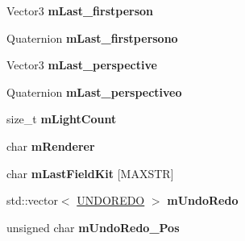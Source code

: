 \begin{DoxyCompactItemize}
\item 
\hypertarget{class_p_f_d_application_afeb39c3ebfbe8d4770601bf56597bfa7}{
Vector3 {\bfseries mLast\_\-firstperson}}
\label{class_p_f_d_application_afeb39c3ebfbe8d4770601bf56597bfa7}

\item 
\hypertarget{class_p_f_d_application_a6b11f53252e21c4c49c4e2a52bc56ec5}{
Quaternion {\bfseries mLast\_\-firstpersono}}
\label{class_p_f_d_application_a6b11f53252e21c4c49c4e2a52bc56ec5}

\item 
\hypertarget{class_p_f_d_application_aeae08f729bab4f54011ba3449c4933cd}{
Vector3 {\bfseries mLast\_\-perspective}}
\label{class_p_f_d_application_aeae08f729bab4f54011ba3449c4933cd}

\item 
\hypertarget{class_p_f_d_application_ae9262bb419094d7f5955e248da0c44bb}{
Quaternion {\bfseries mLast\_\-perspectiveo}}
\label{class_p_f_d_application_ae9262bb419094d7f5955e248da0c44bb}

\item 
\hypertarget{class_p_f_d_application_a8549c48af748676387f598af8b4df757}{
size\_\-t {\bfseries mLightCount}}
\label{class_p_f_d_application_a8549c48af748676387f598af8b4df757}

\item 
\hypertarget{class_p_f_d_application_a9f59d3fda4c0b66931565d82cc5fd280}{
char {\bfseries mRenderer}}
\label{class_p_f_d_application_a9f59d3fda4c0b66931565d82cc5fd280}

\item 
\hypertarget{class_p_f_d_application_aa7c092ce8294861b8a93caabc336f59b}{
char {\bfseries mLastFieldKit} \mbox{[}MAXSTR\mbox{]}}
\label{class_p_f_d_application_aa7c092ce8294861b8a93caabc336f59b}

\item 
\hypertarget{class_p_f_d_application_af4186c5f99c4e29f8f1a55e16a07f8fd}{
std::vector$<$ \hyperlink{struct_u_n_d_o_r_e_d_o}{UNDOREDO} $>$ {\bfseries mUndoRedo}}
\label{class_p_f_d_application_af4186c5f99c4e29f8f1a55e16a07f8fd}

\item 
\hypertarget{class_p_f_d_application_a60a2ce85dd28bad6a6f92c44a74af3d8}{
unsigned char {\bfseries mUndoRedo\_\-Pos}}
\label{class_p_f_d_application_a60a2ce85dd28bad6a6f92c44a74af3d8}

\end{DoxyCompactItemize}


